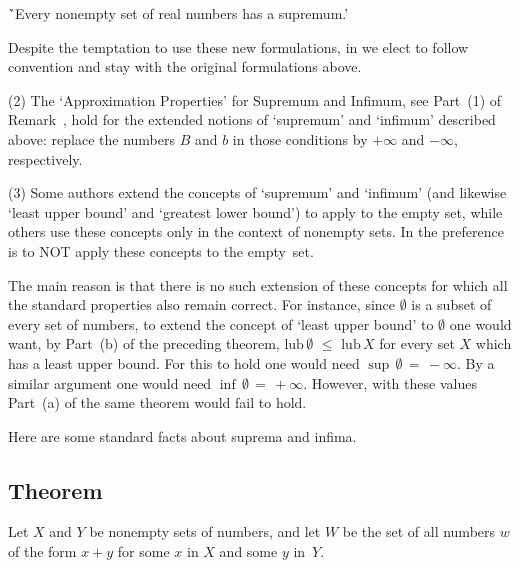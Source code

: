 \VA

        \h `Every nonempty set of real numbers has a supremum.'

\VA

\noindent Despite the temptation to use these new formulations, in {\ThisText} we elect to follow convention and stay with the original formulations above.

\V

        (2) The `Approximation Properties' for Supremum and Infimum, see Part~(1) of Remark~,
    hold for the extended notions of `supremum' and `infimum' described above: replace the numbers $B$ and $b$ in those conditions by $+{\infty}$ and $-{\infty}$, respectively.

\V

        (3) Some authors extend the concepts of `supremum' and `infimum'
    (and likewise `least upper bound' and `greatest lower bound') to apply to the empty set, while others use these concepts only in the context of nonempty sets.
    In {\ThisText} the preference is to NOT apply these concepts to the empty~set.

    The main reason is that there is no such extension of these concepts for which all the standard properties also remain correct.
    For instance, since ${\emptyset}$ is a subset of every set of numbers, to extend the concept of `least upper bound' to ${\emptyset}$ one would want,
    by Part~(b) of the preceding theorem, $\mbox{lub}\,{\emptyset}\,\,{\leq}\,\,\mbox{lub}\,X$
    for every set $X$ which has a least upper bound. For this to hold one would need ${\sup}\,{\emptyset} \,=\, -{\infty}$.
    By a similar argument one would need ${\inf}\,{\emptyset} \,=\, +{\infty}$.
    However, with these values Part~(a) of the same theorem would fail to hold.

\VV

        Here are some standard facts about suprema and infima.

\V

            \subsection{\small{\bf Theorem}}
            \label{TheoremB30.08M}

\V

        Let $X$ and $Y$ be nonempty sets of numbers, and let $W$ be the set of all numbers $w$ of the form $x+y$ for some $x$ in $X$ and some $y$ in~$Y$.

\V

